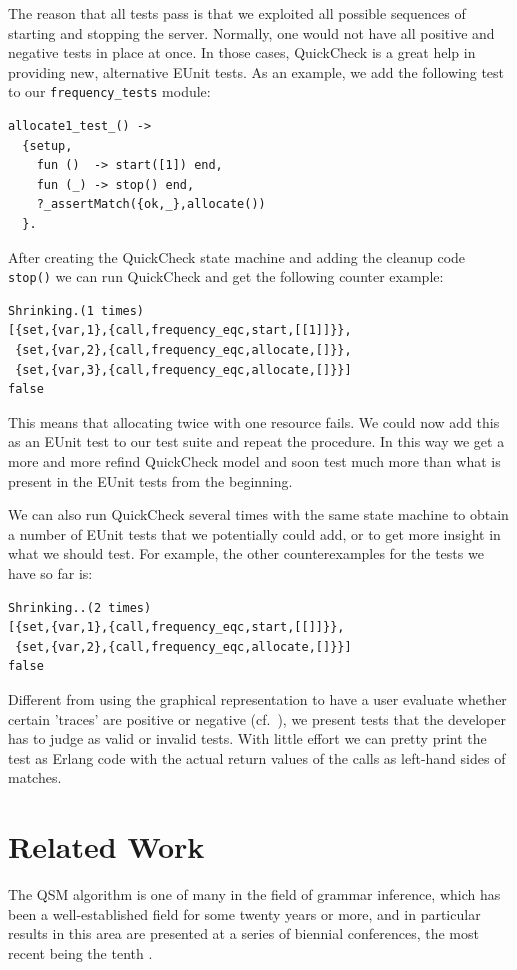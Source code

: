 \documentclass[]{sigplanconf}
\begin{document}
The reason that all tests pass is that we exploited all possible sequences of starting and stopping the server. Normally, one would not have all positive and negative tests in place at once. In those cases, QuickCheck is a great help in providing new, alternative EUnit tests.
As an example, we add the following test to our \texttt{frequency\_tests} module:
\begin{verbatim}
allocate1_test_() ->
  {setup,
    fun ()  -> start([1]) end,  
    fun (_) -> stop() end,
    ?_assertMatch({ok,_},allocate())
  }.
\end{verbatim}

After creating the QuickCheck state machine and adding the cleanup code \verb+stop()+ we can run QuickCheck and get the following counter example:
\begin{verbatim}
Shrinking.(1 times)
[{set,{var,1},{call,frequency_eqc,start,[[1]]}},
 {set,{var,2},{call,frequency_eqc,allocate,[]}},
 {set,{var,3},{call,frequency_eqc,allocate,[]}}]
false
\end{verbatim}
This means that allocating twice with one resource fails. We could now add this as an EUnit test to our test suite and repeat the procedure. In this way we get a more and more refind QuickCheck model and soon test much more than what is present in the EUnit tests from the beginning.

We can also run QuickCheck several times with the same state machine to obtain a number of EUnit tests that we potentially could add, or to get more insight in what we should test. For example, the other counterexamples for the tests we have so far is:
\begin{verbatim}
Shrinking..(2 times)
[{set,{var,1},{call,frequency_eqc,start,[[]]}},
 {set,{var,2},{call,frequency_eqc,allocate,[]}}]
false
\end{verbatim}

Different from using the graphical representation to have a user evaluate whether certain 'traces' are positive or negative (cf.\ \cite{arts2010test}), we present tests that the developer has to judge as valid or invalid tests. With little effort we can pretty print the test as Erlang code with the actual return values of  the calls as left-hand sides of matches. 

\section{Related Work}
\label{RelatedWork}

The QSM algorithm is one of many in the field of grammar inference, which has been a well-established field for some twenty years or more, and in particular results in this area are presented at a series of biennial conferences, the most recent being the tenth \cite{inference}.
\end{document}
